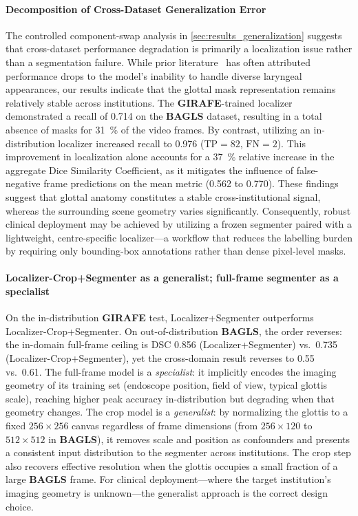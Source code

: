 \documentclass[preprint,12pt]{elsarticle}
\newcommand{\girafe}{\textbf{GIRAFE}}
\newcommand{\bagls}{\textbf{BAGLS}}
\newcommand{\yolounet}{Localizer+Segmenter}
\newcommand{\yolocrop}{Localizer-Crop+Segmenter}
\begin{document}
\paragraph{Decomposition of Cross-Dataset Generalization Error}
The controlled component-swap analysis in \cref{sec:results_generalization} suggests
that cross-dataset performance degradation is primarily a localization issue
rather than a segmentation failure.
While prior literature~\cite{andrade2025datainbrief,dollinger2022} has often
attributed performance drops to the model's inability to handle diverse
laryngeal appearances, our results indicate that the glottal mask
representation remains relatively stable across institutions.
The \girafe{}-trained localizer demonstrated a recall of \num{0.714} on the
\bagls{} dataset, resulting in a total absence of masks for \SI{31}{\%} of
the video frames.
By contrast, utilizing an in-distribution localizer increased recall to
\num{0.976} ($\mathrm{TP}{=}82$, $\mathrm{FN}{=}2$).
This improvement in localization alone accounts for a \SI{37}{\%} relative
increase in the aggregate Dice Similarity Coefficient, as it mitigates the
influence of false-negative frame predictions on the mean metric
(\num{0.562} to \num{0.770}).
These findings suggest that glottal anatomy constitutes a stable
cross-institutional signal, whereas the surrounding scene geometry varies
significantly.
Consequently, robust clinical deployment may be achieved by utilizing a
frozen segmenter paired with a lightweight, centre-specific localizer---a
workflow that reduces the labelling burden by requiring only bounding-box
annotations rather than dense pixel-level masks.

\paragraph{\yolocrop{} as a generalist; full-frame segmenter as a specialist}
On the in-distribution \girafe{} test, \yolounet{} outperforms \yolocrop{}.
On out-of-distribution \bagls{}, the order reverses: the in-domain
full-frame ceiling is DSC \num{0.856} (\yolounet{}) vs.\ \num{0.735}
(\yolocrop{}), yet the cross-domain result reverses to \num{0.55} vs.\ \num{0.61}.
The full-frame model is a \emph{specialist}: it implicitly encodes the
imaging geometry of its training set (endoscope position, field of view,
typical glottis scale), reaching higher peak accuracy in-distribution but
degrading when that geometry changes.
The crop model is a \emph{generalist}: by normalizing the glottis to a
fixed \(256{\times}256\) canvas regardless of frame dimensions (from
\(256{\times}120\) to \(512{\times}512\) in \bagls{}), it removes scale
and position as confounders and presents a consistent input distribution
to the segmenter across institutions.
The crop step also recovers effective resolution when the glottis occupies
a small fraction of a large \bagls{} frame.
For clinical deployment---where the target institution's imaging geometry
is unknown---the generalist approach is the correct design choice.
\end{document}

